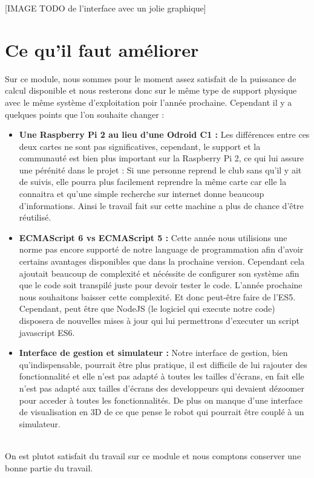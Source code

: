	[IMAGE TODO de l'interface avec un jolie graphique]

	\section{Ce qu'il faut améliorer}
	Sur ce module, nous sommes pour le moment assez satisfait de la puissance de calcul disponible et nous resterons donc sur le même type de support physique avec le même système d'exploitation poir l'année prochaine. Cependant il y a quelques points que l'on souhaite changer :

	\begin{itemize}
		\item \textbf{Une Raspberry Pi 2 au lieu d'une Odroid C1 :} Les différences entre ces deux cartes ne sont pas significatives, cependant, le support et la communauté est bien plus important sur la Raspberry Pi 2, ce qui lui assure une pérénité dans le projet : Si une personne reprend le club sans qu'il y ait de suivis, elle pourra plus facilement reprendre la même carte car elle la connaitra et qu'une simple recherche sur internet donne beaucoup d'informations. Ainsi le travail fait sur cette machine a plus de chance d'être réutilisé.
		\item \textbf{ECMAScript 6 vs ECMAScript 5 :} Cette année nous utilisions une norme pas encore supporté de notre language de programmation afin d'avoir certains avantages disponibles que dans la prochaine version. Cependant cela ajoutait beaucoup de complexité et nécéssite de configurer son système afin que le code soit transpilé juste pour devoir tester le code. L'année prochaine nous souhaitons baisser cette complexité. Et donc peut-être faire de l'ES5. Cependant, peut être que NodeJS (le logiciel qui execute notre code) disposera de nouvelles mises à jour qui lui permettrons d'executer un script javascript ES6.
		\item \textbf{Interface de gestion et simulateur :} Notre interface de gestion, bien qu'indispensable, pourrait être plus pratique, il est difficile de lui rajouter des fonctionnalité et elle n'est pas adapté à toutes les tailles d'écrans, en fait elle n'est pas adapté aux tailles d'écrans des developpeurs qui devaient dézoomer pour acceder à toutes les fonctionnalités. De plus on manque d'une interface de visualisation en 3D de ce que pense le robot qui pourrait être couplé à un simulateur.
	\end{itemize}
	\ \\
	On est plutot satisfait du travail sur ce module et nous comptons conserver une bonne partie du travail.